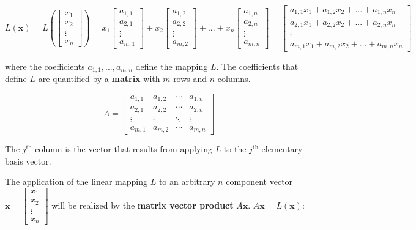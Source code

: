 \documentclass{article}
\begin{document}
\[L(\mathbf{x}) = L\left(\begin{bmatrix} x_1 \\ x_2 \\ \vdots \\ x_n \end{bmatrix}\right) = x_1 \begin{bmatrix} a_{1,1} \\ a_{2,1} \\ \vdots \\ a_{m,1} \end{bmatrix} + x_2 \begin{bmatrix} a_{1,2} \\ a_{2,2} \\ \vdots \\ a_{m,2} \end{bmatrix} + ... + x_n \begin{bmatrix} a_{1,n} \\ a_{2,n} \\ \vdots \\ a_{m,n} \end{bmatrix} = \begin{bmatrix} 
a_{1,1}x_1 + a_{1,2}x_2 + ... + a_{1,n}x_n \\
a_{2,1}x_1 + a_{2,2}x_2 + ... + a_{2,n}x_n \\
\vdots \\
a_{m,1}x_1 + a_{m,2}x_2 + ... + a_{m,n}x_n 
\end{bmatrix}\]

where the coefficients \(a_{1,1}, ..., a_{m,n}\) define the mapping \(L\). The coefficients that define \(L\) are quantified by a {\bf matrix} with \(m\) rows and \(n\) columns. 

\[A = \begin{bmatrix} 
a_{1,1} & a_{1,2} & \cdots & a_{1,n} \\
a_{2,1} & a_{2,2} & \cdots & a_{2,n} \\
\vdots & \vdots & \ddots & \vdots \\
a_{m,1} & a_{m,2} & \cdots & a_{m,n} 
\end{bmatrix}\]

The \(j^{\text{th}}\) column is the vector that results from applying \(L\) to the \(j^{\text{th}}\) elementary basis vector. 

The application of the linear mapping \(L\) to an arbitrary \(n\) component vector \(\mathbf{x} = \begin{bmatrix} x_1 \\ x_2 \\ \vdots \\ x_n \end{bmatrix}\) will be realized by the {\bf matrix vector product} \(A\mathbf{x}\). \(A\mathbf{x} = L(\mathbf{x})\):
\end{document}
